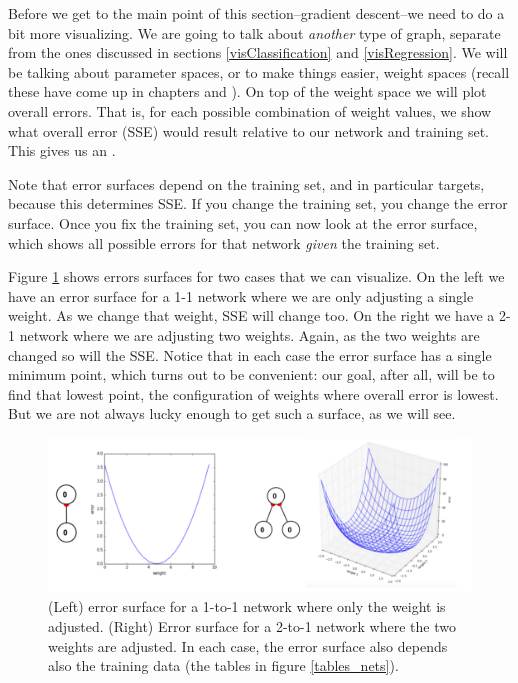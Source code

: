 Before we get to the main point of this section--gradient descent--we need to do a bit more visualizing. We are going to talk about \emph{another} type of graph, separate from the ones discussed in sections \ref{visClassification} and \ref{visRegression}. We will be talking about parameter spaces, or to make things easier, weight spaces (recall these have come up in chapters  and ). On top of the weight space we will plot overall errors. That is, for each possible combination of weight values, we show what overall error (\eg SSE) would result relative to our network and training set. This  gives us an . 

Note that error surfaces depend on the training set, and in particular targets, because this determines SSE. If you change the training set, you change the error surface. Once you fix the training set, you can now look at the error surface, which shows all possible errors for that network \emph{given} the training set.

Figure \ref{error_surfaces} shows errors surfaces for two cases that we can visualize. On the left we have an error surface for a 1-1 network where we are only adjusting a single weight. As we change that weight, SSE will change too. On the right we have a 2-1 network where we are adjusting two weights. Again, as the two weights are changed so will the SSE. Notice that in each case the error surface has a single minimum point, which turns out to be convenient: our goal, after all, will be to find that lowest point, the configuration of weights where overall error is lowest.  But we are not always lucky enough to get such a surface, as we will see.

\begin{figure}[h]
\centering
\includegraphics[scale=.5]{./images/ErrorSurfaces.png}
\caption[Jeff Yoshimi.]{(Left) error surface for a 1-to-1 network where only the weight is adjusted. (Right) Error surface for a 2-to-1 network where the two weights are adjusted. In each case, the error surface also depends also the training data (the tables in figure \ref{tables_nets}). }
\label{error_surfaces}
\end{figure}

